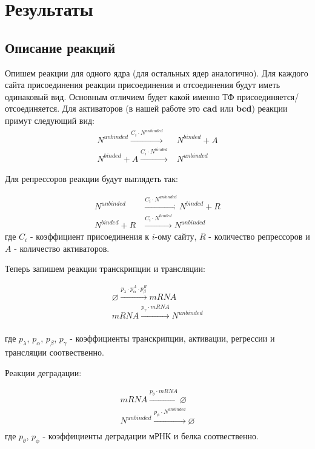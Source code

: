 \section{Результаты}
\subsection{Описание реакций}
Опишем реакции для одного ядра (для остальных ядер аналогично). Для каждого сайта присоединения реакции присоединения и отсоединения будут
иметь одинаковый вид. Основным отличием будет какой именно ТФ присоединяется/отсоединяется. Для активаторов (в нашей работе это \textbf{cad}
или \textbf{bcd}) реакции примут следующий вид:
\begin{align*}
N^{unbinded}   \xrightarrow{C_i \cdot N^{unbinded}} & N^{binded} + A\\
N^{binded} + A \xrightarrow{C_i \cdot N^{binded}}  & N^{unbinded}
\end{align*}

Для репрессоров реакции будут выглядеть так:

\begin{align*}
N^{unbinded}   & \xrightarrow{C_i \cdot N^{unbinded}} N^{binded} + R\\
N^{binded} + R &  \xrightarrow{C_i \cdot N^{binded}}  N^{unbinded}
\end{align*}
где $C_i$ - коэффициент присоединения к $i$-ому сайту, $R$ - количество репрессоров и $A$ - количество активаторов.

Теперь запишем реакции транскрипции и трансляции:

\begin{align*}
\varnothing \xrightarrow{p_{\lambda} \cdot p_{\alpha}^{A} \cdot p_{\beta}^{R}} mRNA \\
mRNA \xrightarrow{p_{\gamma} \cdot mRNA} N^{unbinded} \\
\end{align*}

где $p_{\lambda}$, $p_{\alpha}$, $p_{\beta}$, $p_{\gamma}$ - коэффициенты транскрипции, активации, регрессии и трансляции соотвественно.

Реакции деградации:

\begin{align*}
mRNA \xrightarrow{p_{\theta} \cdot mRNA} \varnothing \\
N^{unbinded} \xrightarrow{p_{\phi} \cdot N^{unbinded}} \varnothing \\
\end{align*}
где $p_{\theta}$, $p_{\phi}$ - коэффициенты деградации мРНК и белка соотвественно.


